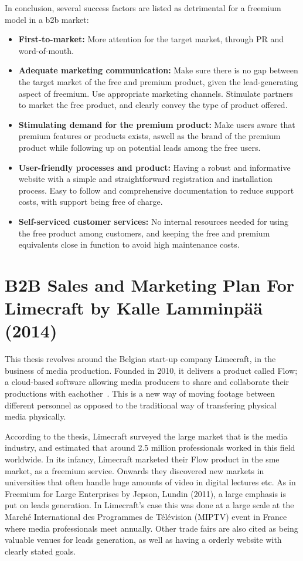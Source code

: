 In conclusion, several success factors are listed as detrimental for a freemium model in a \gls{b2b} market:
\begin{itemize}
    \item \textbf{First-to-market: }More attention for the target market, through PR and word-of-mouth. 
    \item \textbf{Adequate marketing communication: }Make sure there is no gap between the target market of the free and premium product, given the lead-generating aspect of freemium. Use appropriate marketing channels. Stimulate partners to market the free product, and clearly convey the type of product offered.
    \item \textbf{Stimulating demand for the premium product: }Make users aware that premium features or products exists, aswell as the brand of the premium product while following up on potential leads among the free users. 
    \item \textbf{User-friendly processes and product: }Having a robust and informative website with a simple and straightforward registration and installation process. Easy to follow and comprehensive documentation to reduce support costs, with support being free of charge.
    \item \textbf{Self-serviced customer services: }No internal resources needed for using the free product among customers, and keeping the free and premium equivalents close in function to avoid high maintenance costs. 
\end{itemize}

\section{B2B Sales and Marketing Plan For Limecraft by Kalle Lamminpää (2014)}
This thesis revolves around the Belgian start-up company Limecraft, in the business of media production. Founded in 2010, it delivers a product called Flow; a cloud-based software allowing media producers to share and collaborate their productions with eachother~\cite{lamminpaa2014b2b}. This is a new way of moving footage between different personnel as opposed to the traditional way of transfering physical media physically. 


According to the thesis, Limecraft surveyed the large market that is the media industry, and estimated that around 2.5 million professionals worked in this field worldwide. In its infancy, Limecraft marketed their Flow product in the \gls{sme} market, as a freemium service. Onwards they discovered new markets in universities that often handle huge amounts of video in digital lectures etc. As in Freemium for Large Enterprises by Jepson, Lundin (2011), a large emphasis is put on leads generation. In Limecraft's case this was done at a large scale at the  Marché International des Programmes de Télévision (MIPTV) event in France where media professionals meet annually. Other trade fairs are also cited as being valuable venues for leads generation, as well as having a orderly website with clearly stated goals. 


